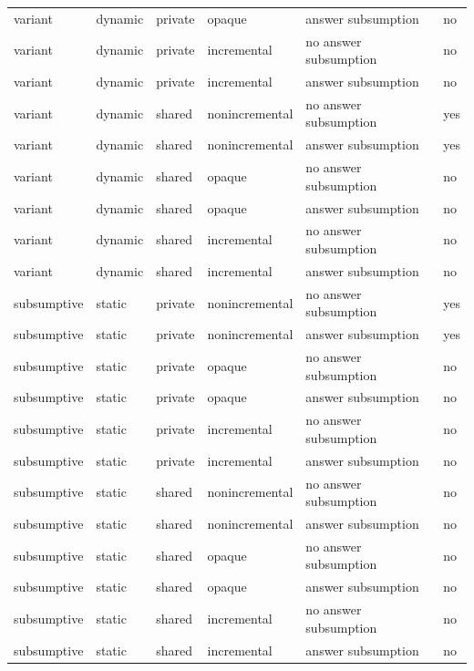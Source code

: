 \begin{table}
\begin{center}
{\begin{tabular}{llllll}
variant &	    dynamic &	   private &	  opaque &	      answer subsumption &	no \\
variant &	    dynamic &	   private &	  incremental &         no answer subsumption &	no \\
variant &	    dynamic &	   private &	  incremental &         answer subsumption &	no \\
variant &	    dynamic &	   shared &	  nonincremental &      no answer subsumption &	yes \\
variant &	    dynamic &	   shared &	  nonincremental &      answer subsumption &	yes \\
variant &	    dynamic &	   shared &	  opaque &	      no answer subsumption &	no \\
variant &	    dynamic &	   shared &	  opaque &	      answer subsumption &	no \\
variant &	    dynamic &	   shared &	  incremental &         no answer subsumption &	no \\
variant &	    dynamic &	   shared &	  incremental &         answer subsumption &	no \\
subsumptive &	    static &	   private &	  nonincremental &      no answer subsumption &	yes \\
subsumptive &	    static &	   private &	  nonincremental &      answer subsumption &	yes \\
subsumptive &	    static &	   private &	  opaque &	      no answer subsumption &	no \\
subsumptive &	    static &	   private &	  opaque &	      answer subsumption &	no \\
subsumptive &	    static &	   private &	  incremental &         no answer subsumption &	no \\
subsumptive &	    static &	   private &	  incremental &         answer subsumption &	no \\
subsumptive &	    static &	   shared &	  nonincremental &      no answer subsumption &	no \\
subsumptive &	    static &	   shared &	  nonincremental &      answer subsumption &	no \\
subsumptive &	    static &	   shared &	  opaque &	      no answer subsumption &	no \\
subsumptive &	    static &	   shared &	  opaque &	      answer subsumption &	no \\
subsumptive &	    static &	   shared &	  incremental &       no answer subsumption &	no \\
subsumptive &	    static &	   shared &	  incremental &          answer subsumption &	no \\

\end{tabular}}
\end{center}
\end{table}
